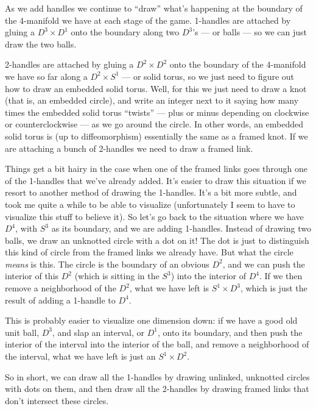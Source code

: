\documentclass[12pt]{article}
\begin{document}
As we add handles we continue to ``draw'' what's happening at the
boundary of the 4-manifold we have at each stage of the game. 1-handles
are attached by gluing a \(D^3 \times D^1\) onto the boundary along two
\(D^3\)'s --- or balls --- so we can just draw the two balls.

2-handles are attached by gluing a \(D^2 \times D^2\) onto the boundary
of the 4-manifold we have so far along a \(D^2 \times S^1\) --- or solid
torus, so we just need to figure out how to draw an embedded solid
torus. Well, for this we just need to draw a knot (that is, an embedded
circle), and write an integer next to it saying how many times the
embedded solid torus ``twists'' --- plus or minus depending on clockwise
or counterclockwise --- as we go around the circle. In other words, an
embedded solid torus is (up to diffeomorphism) essentially the same as a
framed knot. If we are attaching a bunch of 2-handles we need to draw a
framed link.

Things get a bit hairy in the case when one of the framed links goes
through one of the 1-handles that we've already added. It's easier to
draw this situation if we resort to another method of drawing the
1-handles. It's a bit more subtle, and took me quite a while to be able
to visualize (unfortunately I seem to have to visualize this stuff to
believe it). So let's go back to the situation where we have \(D^4\),
with \(S^3\) as its boundary, and we are adding 1-handles. Instead of
drawing two balls, we draw an unknotted circle with a dot on it! The dot
is just to distinguish this kind of circle from the framed links we
already have. But what the circle \emph{means} is this. The circle is
the boundary of an obvious \(D^2\), and we can push the interior of this
\(D^2\) (which is sitting in the \(S^3\)) into the interior of \(D^4\).
If we then remove a neighborhood of the \(D^2\), what we have left is
\(S^1 \times D^3\), which is just the result of adding a 1-handle to
\(D^4\).

This is probably easier to visualize one dimension down: if we have a
good old unit ball, \(D^3\), and slap an interval, or \(D^1\), onto its
boundary, and then push the interior of the interval into the interior
of the ball, and remove a neighborhood of the interval, what we have
left is just an \(S^1 \times D^2\).

So in short, we can draw all the 1-handles by drawing unlinked,
unknotted circles with dots on them, and then draw all the 2-handles by
drawing framed links that don't intersect these circles.
\end{document}
